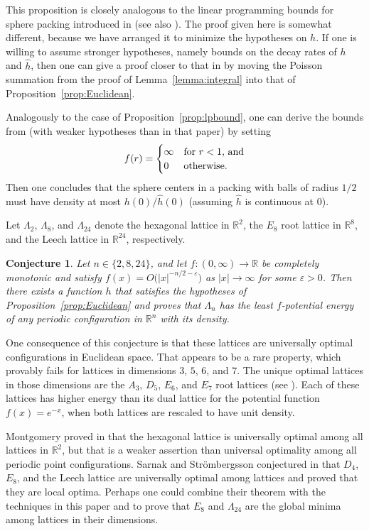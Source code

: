 \documentclass{jams-l}
\theoremstyle{plain}
\newtheorem{conjecture}[theorem]{Conjecture}
\numberwithin{theorem}{section}
\theoremstyle{definition}
\numberwithin{equation}{section}
\newcommand{\R}{{\mathbb R}}
\newcommand{\co}{\colon}
\begin{document}
This proposition is closely analogous to the linear programming
bounds for sphere packing introduced in \cite{CE} (see also
\cite{C,CK1,CK2}).  The proof given here is somewhat different,
because we have arranged it to minimize the hypotheses on $h$.  If
one is willing to assume stronger hypotheses, namely bounds on the
decay rates of $h$ and $\widehat{h}$, then one can give a proof
closer to that in \cite{CE} by moving the Poisson summation from
the proof of Lemma~\ref{lemma:integral} into that of
Proposition~\ref{prop:Euclidean}.

Analogously to the case of Proposition~\ref{prop:lpbound}, one can
derive the bounds from \cite{CE} (with weaker hypotheses than in
that paper) by setting
$$
f(r) = \begin{cases} \infty & \textup{for $r < 1$, and}\\
0 & \textup{otherwise.}
\end{cases}
$$
Then one concludes that the sphere centers in a packing with balls
of radius $1/2$ must have density at most $h(0)/\widehat{h}(0)$
(assuming $\widehat{h}$ is continuous at $0$).

Let $\Lambda_2$, $\Lambda_8$, and $\Lambda_{24}$ denote the
hexagonal lattice in $\R^2$, the $E_8$ root lattice in $\R^8$, and
the Leech lattice in $\R^{24}$, respectively.

\begin{conjecture}\label{conj:opt}
Let $n \in \{2,8,24\}$, and let $f \co (0,\infty) \to \R$ be
completely monotonic and satisfy $f(x) =
O\big(|x|^{-n/2-\varepsilon}\big)$ as $|x| \to \infty$ for some
$\varepsilon>0$. Then there exists a function $h$ that satisfies
the hypotheses of Proposition~\ref{prop:Euclidean} and proves that
$\Lambda_n$ has the least $f$-potential energy of any periodic
configuration in $\R^n$ with its density.
\end{conjecture}

One consequence of this conjecture is that these lattices are
universally optimal configurations in Euclidean space.  That
appears to be a rare property, which provably fails for lattices
in dimensions $3$, $5$, $6$, and $7$. The unique optimal lattices
in those dimensions are the $A_3$, $D_5$, $E_6$, and $E_7$ root
lattices (see \cite{Mar}). Each of these lattices has higher
energy than its dual lattice for the potential function $f(x) =
e^{-x}$, when both lattices are rescaled to have unit density.

Montgomery proved in \cite{Mo} that the hexagonal lattice is
universally optimal among all lattices in $\R^2$, but that is a
weaker assertion than universal optimality among all periodic
point configurations.  Sarnak and Str\"ombergsson conjectured in
\cite{SS} that $D_4$, $E_8$, and the Leech lattice are universally
optimal among lattices and proved that they are local optima.
Perhaps one could combine their theorem with the techniques in
this paper and \cite{CK1} to prove that $E_8$ and $\Lambda_{24}$
are the global minima among lattices in their dimensions.
\end{document}

